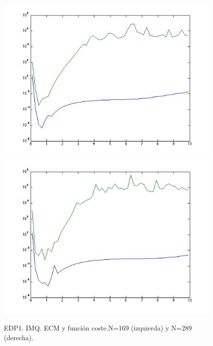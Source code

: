 \documentclass[11pt,a4paper]{article}
\begin{document}
\begin{figure}[H]
\includegraphics[scale=.4]{edp1_169_imq.jpg}
\includegraphics[scale=.4]{edp1_289_imq.jpg}
\caption{EDP1. IMQ. ECM y función coste.N=169 (izquierda) y N=289 (derecha).}
\end{figure}
\end{document}
